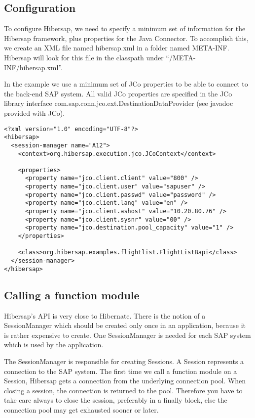 \subsection{Configuration}

To configure Hibersap, we need to specify a minimum set of information for the Hibersap framework,
plus properties for the Java Connector. To accomplish this, we create an XML file named hibersap.xml in a folder
named META-INF. Hibersap will look for this file in the classpath under ``/META-INF/hibersap.xml''.

In the example we use a minimum set of JCo properties to be able to connect to the back-end SAP system.
All valid JCo properties are specified in the JCo library interface com.\-sap.\-conn.\-jco.\-ext.\-DestinationDataProvider (see
javadoc provided with JCo).

\begin{Verbatim}[frame=single,label=hibersap.xml]
<?xml version="1.0" encoding="UTF-8"?>
<hibersap>
  <session-manager name="A12">
    <context>org.hibersap.execution.jco.JCoContext</context>

    <properties>
      <property name="jco.client.client" value="800" />
      <property name="jco.client.user" value="sapuser" />
      <property name="jco.client.passwd" value="password" />
      <property name="jco.client.lang" value="en" />
      <property name="jco.client.ashost" value="10.20.80.76" />
      <property name="jco.client.sysnr" value="00" />
      <property name="jco.destination.pool_capacity" value="1" />
    </properties>

    <class>org.hibersap.examples.flightlist.FlightListBapi</class>
  </session-manager>
</hibersap>
\end{Verbatim}


\subsection{Calling a function module}

Hibersap's API is very close to Hibernate.
There is the notion of a SessionManager which should be created only once in an application,
because it is rather expensive to create.
One SessionManager is needed for each SAP system which is used by the application.

The SessionManager is responsible for creating Sessions.
A Session represents a connection to the SAP system. The first time we call a function module
on a Session, Hibersap gets a connection from the underlying connection pool.
When closing a session, the connection is returned to the pool. Therefore you have to take care
always to close the session, preferably in a finally block, else the connection pool may
get exhausted sooner or later.

